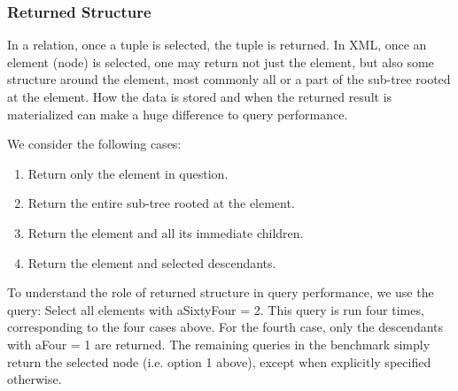 \subsubsection{Returned Structure}
In a relation, once a tuple is selected, the tuple is returned. In
XML, once an element (node) is selected, one may return not just the
element, but also some structure around the element, most commonly all
or a part of the sub-tree rooted at the element.  How the data is
stored and when the returned result is materialized can make a huge
difference to query performance.

We consider the following cases:
\begin{enumerate}
\item
Return only the element in question.
\item
Return the entire sub-tree rooted at the element.
\item
Return the element and all its immediate children.
\item
Return the element and selected descendants.
\end{enumerate}

To understand the role of returned structure in query performance, we
use the query: Select all elements with {\sf aSixtyFour = 2}. This
query is run four times, corresponding to the four cases above.  For
the fourth case, only the descendants with {\sf aFour = 1} are
returned.  The remaining queries in the benchmark simply return the
selected node (i.e. option 1 above), except when explicitly specified
otherwise.
